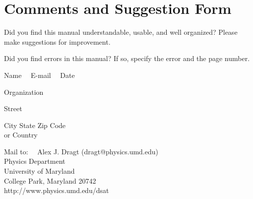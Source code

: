 
\setcounter{chapter}{11}
\chapter{Comments and Suggestion Form}
Did you find this manual understandable, usable, and well organized?  Please make suggestions for improvement.

\noindent  \hrulefill \mbox{}

\noindent  \hrulefill \mbox{}

\noindent  \hrulefill \mbox{}

\noindent  \hrulefill \mbox{}

\noindent  \hrulefill \mbox{}

\noindent  \hrulefill \mbox{}

\noindent  \hrulefill \mbox{}

\noindent  \hrulefill \mbox{}

\noindent  \hrulefill \mbox{}

\noindent Did you find errors in this manual?  If so, specify the error and the page number.

\noindent  \hrulefill \mbox{}

\noindent  \hrulefill \mbox{}

\noindent  \hrulefill \mbox{}

\noindent  \hrulefill \mbox{}

\noindent  \hrulefill \mbox{}

\noindent  \hrulefill \mbox{}

\noindent  \hrulefill \mbox{}

\noindent  \hrulefill \mbox{}

\noindent  \hrulefill \mbox{}

\vspace{.2in}
\noindent Name \hrulefill  \hrulefill  \hrulefill \ \ E-mail \hrulefill \hrulefill \hrulefill  \ \ Date \hrulefill

\noindent Organization \hrulefill

\noindent Street \hrulefill

\noindent City \hrulefill State \hrulefill Zip Code \hrulefill \\
\mbox{} \hspace{4in} or Country

\vspace{.2in}
\noindent Mail to: \ \ Alex J. Dragt (dragt@physics.umd.edu) \\
\mbox{} \hspace{.65in} Physics Department \\
\mbox{} \hspace{.65in} University of Maryland \\
\mbox{} \hspace{.65in} College Park, Maryland  20742 \\
\mbox{} \hspace{.65in} http://www.physics.umd.edu/dsat
